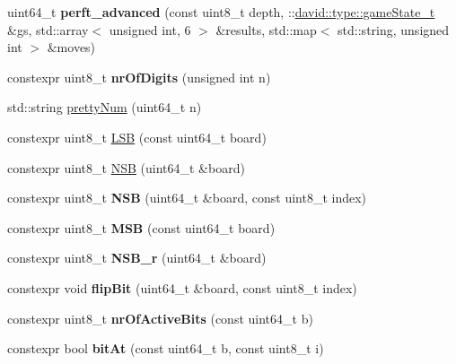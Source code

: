 \begin{DoxyCompactItemize}
uint64\+\_\+t {\bfseries perft\+\_\+advanced} (const uint8\+\_\+t depth, \+::\hyperlink{structdavid_1_1bitboard_1_1gameState}{david\+::type\+::game\+State\+\_\+t} \&gs, std\+::array$<$ unsigned int, 6 $>$ \&results, std\+::map$<$ std\+::string, unsigned int $>$ \&moves)
\item 
\mbox{\label{namespaceutils_a44e29e39147f6057ad3e8296f2f2ad64}} 
constexpr uint8\+\_\+t {\bfseries nr\+Of\+Digits} (unsigned int n)
\item 
std\+::string \hyperlink{namespaceutils_abf9ae68bb8aa601d647ebed1fe7d8972}{pretty\+Num} (uint64\+\_\+t n)
\item 
constexpr uint8\+\_\+t \hyperlink{namespaceutils_aa2421ac142f51f3a3f99aefb9ee80661}{L\+SB} (const uint64\+\_\+t board)
\item 
constexpr uint8\+\_\+t \hyperlink{namespaceutils_aa9a43407479c837a168958d3a9e79540}{N\+SB} (uint64\+\_\+t \&board)
\item 
\mbox{\label{namespaceutils_abd208a64eda1dac3b9ac8c5c94e43682}} 
constexpr uint8\+\_\+t {\bfseries N\+SB} (uint64\+\_\+t \&board, const uint8\+\_\+t index)
\item 
\mbox{\label{namespaceutils_a74e7103359cc9c9669e2235fc6e7015e}} 
constexpr uint8\+\_\+t {\bfseries M\+SB} (const uint64\+\_\+t board)
\item 
\mbox{\label{namespaceutils_a07780b011c2f5095af9befdff65d34c7}} 
constexpr uint8\+\_\+t {\bfseries N\+S\+B\+\_\+r} (uint64\+\_\+t \&board)
\item 
\mbox{\label{namespaceutils_a840479011293cc95b788bfe87d68c87a}} 
constexpr void {\bfseries flip\+Bit} (uint64\+\_\+t \&board, const uint8\+\_\+t index)
\item 
\mbox{\label{namespaceutils_ae60793efa330e1ec4bbfd0b8ac6d1894}} 
constexpr uint8\+\_\+t {\bfseries nr\+Of\+Active\+Bits} (const uint64\+\_\+t b)
\item 
\mbox{\label{namespaceutils_a48c9fa064f732d6b7a2a93fdaa8f955d}} 
constexpr bool {\bfseries bit\+At} (const uint64\+\_\+t b, const uint8\+\_\+t i)
\item 
\mbox{\label{namespaceutils_a774431d48bffc6d6d71d638ee1d4ddc4}} 

\end{DoxyCompactItemize}
